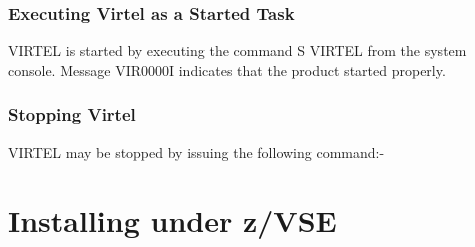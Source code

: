 \documentclass[letterpaper,10pt,english]{sphinxmanual}
\begin{document}
\begin{sphinxVerbatim}[commandchars=\\\{\}]
  
\end{sphinxVerbatim}


\subsection{Executing Virtel as a Started Task}
\label{\detokenize{Installation_Guide:executing-virtel-as-a-started-task}}
VIRTEL is started by executing the command S VIRTEL from the system console. Message VIR0000I indicates that the product started properly.


\subsection{Stopping Virtel}
\label{\detokenize{Installation_Guide:stopping-virtel}}
VIRTEL may be stopped by issuing the following command:-

\begin{sphinxVerbatim}[commandchars=\\\{\}]
 
\end{sphinxVerbatim}

\ignorespaces 

\chapter{Installing under z/VSE}
\label{\detokenize{Installation_Guide:installing-under-z-vse}}\label{\detokenize{Installation_Guide:index-16}}
\ignorespaces 
\end{document}
